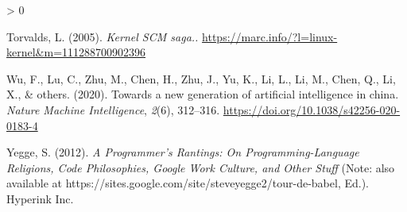 \documentclass[
  14pt
  american,
  paper=a4,
  ,captions=tableheading
]{scrbook}
\newlength{\cslhangindent}
\newenvironment{CSLReferences}[2] %
 {%
  \setlength{\parindent}{0pt}
  \ifodd #1 \everypar{\setlength{\hangindent}{\cslhangindent}}\ignorespaces\fi
  \ifnum #2 > 0
  \setlength{\parskip}{#2\baselineskip}
  \fi
 }%
 {}
\begin{document}
\begin{CSLReferences}{1}{0}
\leavevmode\hypertarget{ref-torvalds2005}{}%
Torvalds, L. (2005). \emph{{Kernel SCM saga..}}
\url{https://marc.info/?l=linux-kernel\&m=111288700902396}

\leavevmode\hypertarget{ref-wu2020towards}{}%
Wu, F., Lu, C., Zhu, M., Chen, H., Zhu, J., Yu, K., Li, L., Li, M.,
Chen, Q., Li, X., \& others. (2020). Towards a new generation of
artificial intelligence in china. \emph{Nature Machine Intelligence},
\emph{2}(6), 312--316. \url{https://doi.org/10.1038/s42256-020-0183-4}

\leavevmode\hypertarget{ref-yegge2012programmer}{}%
Yegge, S. (2012). \emph{{A Programmer's Rantings: On
Programming-Language Religions, Code Philosophies, Google Work Culture,
and Other Stuff}} (Note: also available at
https://sites.google.com/site/steveyegge2/tour-de-babel, Ed.). Hyperink
Inc.

\end{CSLReferences}

\end{document}
